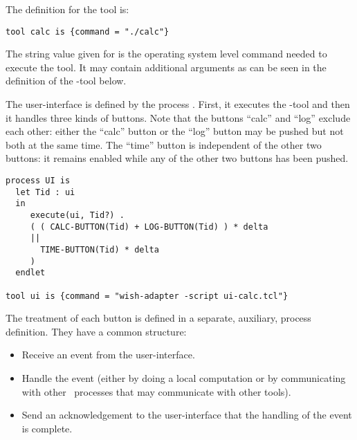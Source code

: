  \noindent The definition for the  tool is:

\small
\begin{verbatim}
tool calc is {command = "./calc"}

\end{verbatim}
\noindent
\normalsize
 The string value given for  is the operating system level
 command needed to execute the tool. It may contain additional arguments
 as can be seen in the definition of the -tool below.

 The user-interface is defined by the
 process . First, it executes the -tool and then
 it handles three kinds of buttons.
 Note that the buttons ``calc'' and ``log'' exclude each other:
 either the ``calc'' button or the ``log'' button may be pushed but not both at the same time.
 The ``time'' button is independent of the other two buttons: it remains enabled
 while any of the other two buttons has been pushed.

\small
\begin{verbatim}
process UI is
  let Tid : ui
  in
     execute(ui, Tid?) .
     ( ( CALC-BUTTON(Tid) + LOG-BUTTON(Tid) ) * delta
     ||
       TIME-BUTTON(Tid) * delta
     )
  endlet

tool ui is {command = "wish-adapter -script ui-calc.tcl"}

\end{verbatim}
\noindent
\normalsize
 The treatment of each button is defined in a separate, auxiliary,
 process definition. They have a common structure:
 \begin{itemize}
 \item Receive an event from the user-interface.
 \item Handle the event (either by doing a local
 computation or by communicating with other \TB\ processes that may
 communicate with other tools).
 \item Send an acknowledgement to the user-interface that the handling
 of the event is complete.
 \end{itemize}

